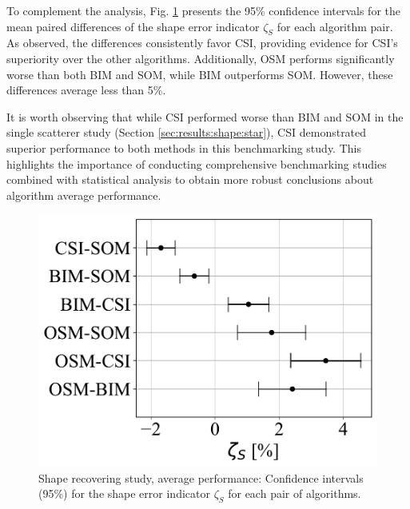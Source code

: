 \documentclass{IEEEtran}
\begin{document}
                To complement the analysis, Fig. \ref{fig:shape:average:confidence_intervals} presents the 95\% confidence intervals for the mean paired differences of the shape error indicator $\zeta_S$ for each algorithm pair. As observed, the differences consistently favor CSI, providing evidence for CSI's superiority over the other algorithms. Additionally, OSM performs significantly worse than both BIM and SOM, while BIM outperforms SOM. However, these differences average less than 5\%.

                It is worth observing that while CSI performed worse than BIM and SOM in the single scatterer study (Section \ref{sec:results:shape:star}), CSI demonstrated superior performance to both methods in this benchmarking study. This highlights the importance of conducting comprehensive benchmarking studies combined with statistical analysis to obtain more robust conclusions about algorithm average performance.
                
                \begin{figure}
                    \centering
                    \includegraphics[width=.9\columnwidth]{../experiments/average/figs/confidence_intervals.pdf}
                    \caption{Shape recovering study, average performance: Confidence intervals (95\%) for the shape error indicator $\zeta_S$ for each pair of algorithms.}
                    \label{fig:shape:average:confidence_intervals}
                \end{figure}

		
\end{document}
